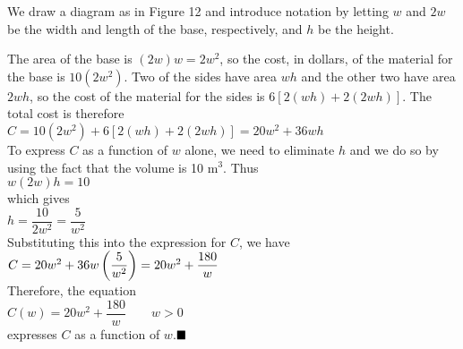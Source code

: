 \documentclass{sebase}
\begin{document}
\begin{Solution}
We draw a diagram as in Figure 12 and introduce notation by letting $w$ and 
$2w$ be the width and length of the base, respectively, and $h$ be the
height.

The area of the base is $(2w)w=2w^{2}$, so the cost, in dollars, of the
material for the base is $10(2w^{2})$. Two of the sides have area $wh$ and
the other two have area $2wh$, so the cost of the material for the sides is $%
6[2(wh)+2(2wh)]$. The total cost is therefore\\[6pt]
\hspace*{\fill}$C=10(2w^{2})+6[2(wh)+2(2wh)]=20w^{2}+36wh$\hspace*{\fill}\\[%
6pt]
To express $C$ as a function of $w$ alone, we need to eliminate $h$ and we
do so by using the fact that the volume is 10 m$^{3}$. Thus\\[4pt]
\hspace*{\fill}$w(2w)h=10$\hspace*{\fill}\\[6pt]
which gives \\[3pt]
\hspace*{\fill}$h=\dfrac{10}{2w^{2}}=\dfrac{5}{w^{2}}$\hspace*{\fill}\\[6pt]
Substituting this into
the expression for $C$, we have\\[4pt]
\hspace*{\fill}$C=20w^{2}+36w\left( \dfrac{5}{w^{2}}\right) =20w^{2}+\dfrac{%
180}{w}$\hspace*{\fill}\\[6pt]
Therefore, the equation \\[4pt]
\hspace*{\fill}$C(w)=20w^{2}+\dfrac{180}{w}\qquad w>0$\hspace*{\fill}\\[6pt]
expresses $C$ as a function of $w$.$\vspace{-12pt}\blacksquare $
\end{Solution}
\end{document}

